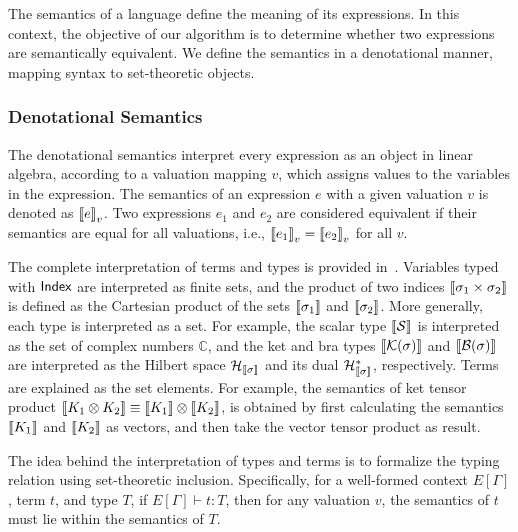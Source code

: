 \documentclass[runningheads]{llncs}
\begin{document}
The semantics of a language define the meaning of its expressions. In this context, the objective of our algorithm is to determine whether two expressions are semantically equivalent. We define the semantics in a denotational manner, mapping syntax to set-theoretic objects.

\subsubsection{Denotational Semantics}
The denotational semantics interpret every expression as an object in linear algebra, according to a valuation mapping \( v \), which assigns values to the variables in the expression. The semantics of an expression \( e \) with a given valuation \( v \) is denoted as \( {\llbracket e \rrbracket}_v \). Two expressions \( e_1 \) and \( e_2 \) are considered equivalent if their semantics are equal for all valuations, i.e., \( {\llbracket e_1 \rrbracket}_v = {\llbracket e_2 \rrbracket}_v \) for all \( v \).

The complete interpretation of terms and types is provided in~. Variables typed with \( \mathsf{Index} \) are interpreted as finite sets, and the product of two indices \( {\llbracket \sigma_1 \times \sigma_2 \rrbracket} \) is defined as the Cartesian product of the sets \( {\llbracket \sigma_1 \rrbracket} \) and \( {\llbracket \sigma_2 \rrbracket} \). More generally, each type is interpreted as a set. For example, the scalar type \( {\llbracket \mathcal{S} \rrbracket} \) is interpreted as the set of complex numbers \( \mathbb{C} \), and the ket and bra types \( {\llbracket \mathcal{K}(\sigma) \rrbracket} \) and \( {\llbracket \mathcal{B}(\sigma) \rrbracket} \) are interpreted as the Hilbert space \( \mathcal{H}_{{\llbracket \sigma \rrbracket}} \) and its dual \( \mathcal{H}_{{\llbracket \sigma \rrbracket}}^* \), respectively. Terms are explained as the set elements. For example, the semantics of ket tensor product ${\llbracket K_1 \otimes K_2 \rrbracket} \equiv {\llbracket K_1 \rrbracket} \otimes {\llbracket K_2 \rrbracket}$, is obtained by first calculating the semantics ${\llbracket K_1 \rrbracket}$ and ${\llbracket K_2 \rrbracket}$ as vectors, and then take the vector tensor product as result.


The idea behind the interpretation of types and terms is to formalize the typing relation using set-theoretic inclusion. Specifically, for a well-formed context \( E[\Gamma] \), term \( t \), and type \( T \), if \( E[\Gamma] \vdash t : T \), then for any valuation \( v \), the semantics of \( t \) must lie within the semantics of \( T \).
\end{document}

